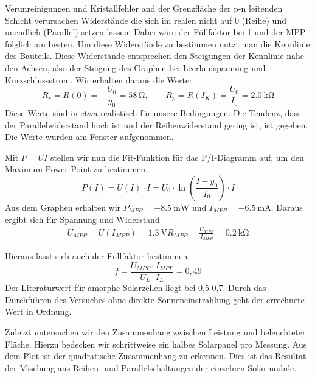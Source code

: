 Verunreinigungen und Kristallfehler and der Grenzfläche der p-n leitenden Schicht verursachen Widerstände die sich im realen nicht auf 0 (Reihe) und unendlich (Parallel) setzen lassen.
Dabei wäre der Füllfaktor bei 1 und der MPP folglich am besten.
Um diese Widerstände zu bestimmen nutzt man die Kennlinie des Bauteils.
Diese Widerstände entsprechen den Steigungen der Kennlinie nahe den Achsen, also der Steigung des Graphen bei Leerlaufspannung und Kurzschlussstrom.
Wir erhalten daraus die Werte:
\[
R_s=R(0)=-\frac{U_0}{y_0}=\SI{58}{\ohm}, \qquad
R_p=R(I_K)=\frac{U_0}{I_0}=\SI{2,0}{\kilo \ohm}
\]
Diese Werte sind in etwa realistisch für unsere Bedingungen. Die Tendenz, dass der Parallelwiderstand hoch ist und der Reihenwiderstand gering ist, ist gegeben. Die Werte wurden am Fenster aufgenommen.

Mit $P=UI$ stellen wir nun die Fit-Funktion für das P/I-Diagramm auf, um den Maximum Power Point zu bestimmen.
\[
	P(I)=U(I) \cdot I=U_0 \cdot \ln \left( \frac{I-y_0}{I_0} \right) \cdot I
\]
Aus dem Graphen erhalten wir $P_{MPP}= \SI{-8,5}{\milli \watt}$ und $I_{MPP} = \SI{-6,5}{\milli \ampere}$.
Daraus ergibt sich für Spannung und Widerstand
\begin{align*}
	U_{MPP} = U(I_{MPP}) = \SI{1,3}{\volt}
	R_{MPP} = \frac{U_{MPP}}{I_{MPP}} = \SI{0,2}{\kilo \ohm}
\end{align*}

Hieraus lässt sich auch der Füllfaktor bestimmen.
\[
	f= \frac{U_{MPP} \cdot I_{MPP}}{U_L \cdot I_L} = 0,49
\]
Der Literaturwert für amorphe Solarzellen liegt bei 0,5-0,7. Durch das Durchführen des Versuches ohne direkte Sonneneinstrahlung geht der errechnete Wert in Ordnung.

Zuletzt untersuchen wir den Zusammenhang zwischen Leistung und beleuchteter Fläche. Hierzu bedecken wir schrittweise ein halbes Solarpanel pro Messung. Aus dem Plot  ist der quadratische Zusammenhang zu erkennen. Dies ist das Resultat der Mischung aus Reihen- und Parallelschaltungen der einzelnen Solarmodule. 
